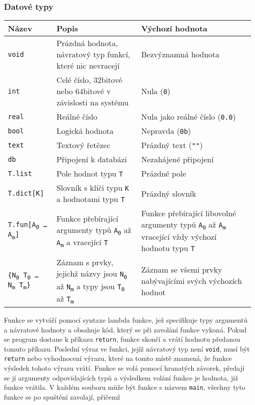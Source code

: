 \documentclass[a4paper,12pt]{article}
\def\quote #1{"#1"}
\begin{document}
\subsubsection{Datové typy}
\begin{tabular}{|m{3.5cm} m{6cm} m{5cm}|}\hline
Název & Popis & Výchozí hodnota \\\hline
\texttt{void} & Prázdná hodnota, návratový typ funkcí, které nic nevracejí & Bezvýznamná hodnota\\\hline
\texttt{int} & Celé číslo, 32bitové nebo 64bitové v závislosti na systému & Nula (\texttt{0})\\\hline
\texttt{real} & Reálné číslo & Nula jako reálné číslo (\texttt{0.0})\\\hline
\texttt{bool} & Logická hodnota & Nepravda (\texttt{0b})\\\hline
\texttt{text} & Textový řetězec & Prázdný text (\texttt{\quote{}})\\\hline
\texttt{db} & Připojení k databázi & Nezahájené připojení\\\hline
\texttt{T.list} & Pole hodnot typu \texttt{T} & Prázdné pole\\\hline
\texttt{T.dict[K]} & Slovník s klíči typu \texttt{K} a hodnotami typu \texttt{T} & Prázdný slovník\\\hline
\texttt{T.fun[A\textsubscript{0} \ldots{} A\textsubscript{m}]} & Funkce přebírající argumenty typů \texttt{A\textsubscript{0}} až \texttt{A\textsubscript{m}} a vracející \texttt{T} & Funkce přebírající libovolné argumenty typů \texttt{A\textsubscript{0}} až \texttt{A\textsubscript{m}} vracející vždy výchozí hodnotu typu \texttt{T}\\\hline
\texttt{\{N\textsubscript{0} T\textsubscript{0} \ldots{} N\textsubscript{m} T\textsubscript{m}\}} & Záznam s prvky, jejichž názvy jsou \texttt{N\textsubscript{0}} až \texttt{N\textsubscript{m}} a typy jsou \texttt{T\textsubscript{0}} až \texttt{T\textsubscript{m}} & Záznam se všemi prvky nabývajícími svých výchozích hodnot\\\hline
\end{tabular}

Funkce se vytváří pomocí syntaxe lambda funkce, jež specifikuje typy argumentů a návratové hodnoty a obsahuje kód, který se při zavolání funkce vykoná. Pokud se program dostane k příkazu \texttt{return}, funkce skončí a vrátí hodnotu předanou tomuto příkazu. Poslední výraz ve funkci, jejíž návratový typ není \texttt{void}, musí být \texttt{return} nebo vyhodnocení výrazu, které na tomto místě znamená, že funkce výsledek tohoto výrazu vrátí. Funkce se volá pomocí hranatých závorek, předají se jí argumenty odpovídajících typů a výsledkem volání funkce je hodnota, již funkce vrátila. V každém souboru může být funkce s názvem \texttt{main}, všechny tyto funkce se po spuštění zavolají, přičemž 
\end{document}
